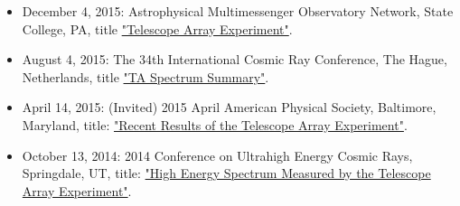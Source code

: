 \documentclass[12pt,letterpaper]{article} %
\begin{document}
{\begin{itemize}
		\item December 4, 2015: Astrophysical Multimessenger Observatory Network, State College, PA, title \href{https://sites.psu.edu/amonworkshop/wp-content/uploads/sites/34307/2015/12/Ivanov_TA_AMON.pdf}{"Telescope Array Experiment"}.
		\item August   4, 2015: The 34th International Cosmic Ray Conference, The Hague, Netherlands, title \href{https://pos.sissa.it/236/349/pdf}{"TA Spectrum Summary"}.
		\item April   14, 2015: (Invited) 2015 April American Physical Society, Baltimore, Maryland, title: \href{http://meetings.aps.org/Meeting/APR15/Session/Y9.3}{"Recent Results of the Telescope Array Experiment"}.
		\item October 13, 2014: 2014 Conference on Ultrahigh Energy Cosmic Rays, Springdale, UT, title: \href{http://uhecr2014.telescopearray.org/finished/ivanov/ivanov_uhecr2014.pdf}{"High Energy Spectrum Measured by the Telescope Array Experiment"}. 
	\end{itemize}
}
\end{document}
